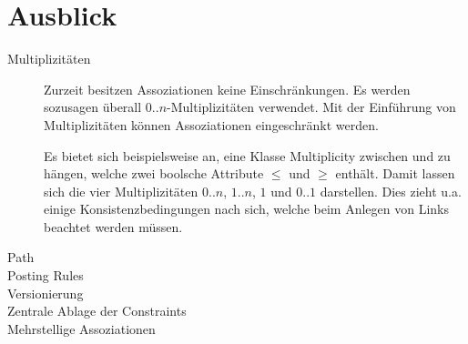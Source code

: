 \section{Ausblick}



\begin{description}
  \item[Multiplizitäten] Zurzeit besitzen Assoziationen keine Einschränkungen. 
Es werden sozusagen überall $0..n$-Multiplizitäten verwendet. 
Mit der Einführung von Multiplizitäten können Assoziationen eingeschränkt werden.
 
Es bietet sich beispielsweise an, eine Klasse Multiplicity zwischen  und  zu hängen,
welche zwei boolsche Attribute $\leq$ und $\geq$ enthält. 
Damit lassen sich die vier Multiplizitäten $0..n$, $1..n$, $1$ und $0..1$ darstellen.
Dies zieht u.a. einige Konsistenzbedingungen nach sich, welche beim Anlegen von Links beachtet werden müssen. 
  \item[Path]
  \item[Posting Rules]
  \item[Versionierung]
  \item[Zentrale Ablage der Constraints]
  \item[Mehrstellige Assoziationen]
\end{description}
  